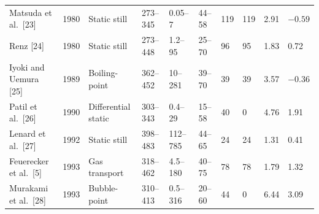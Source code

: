 \documentclass[11pt]{article}
\begin{document}
\begin{landscape}
\begin{longtable}{llllllllll}
Matsuda et al.\ [23]     & 1980 & Static still      & 273--345 & 0.05--7      & 44--58 & 119 & 119 & 2.91  & $-0.59$ \\
Renz [24]                & 1980 & Static still      & 273--448 & 1.2--95      & 25--70 & 96  & 95  & 1.83  & 0.72 \\
Iyoki and Uemura [25]    & 1989 & Boiling-point     & 362--452 & 10--281      & 39--70 & 39  & 39  & 3.57  & $-0.36$ \\
Patil et al.\ [26]       & 1990 & Differential static & 303--343 & 0.4--29    & 15--58 & 40  & 0   & 4.76  & 1.91 \\
Lenard et al.\ [27]      & 1992 & Static still      & 398--483 & 112--785     & 44--65 & 24  & 24  & 1.31  & 0.41 \\
Feuerecker et al.\ [5]   & 1993 & Gas transport     & 318--462 & 4.5--180     & 40--75 & 78  & 78  & 1.79  & 1.32 \\
Murakami et al.\ [28]    & 1993 & Bubble-point      & 310--413 & 0.5--316     & 20--60 & 44  & 0   & 6.44  & 3.09 \\
\bottomrule
\end{longtable}


\end{landscape}
\end{document}

